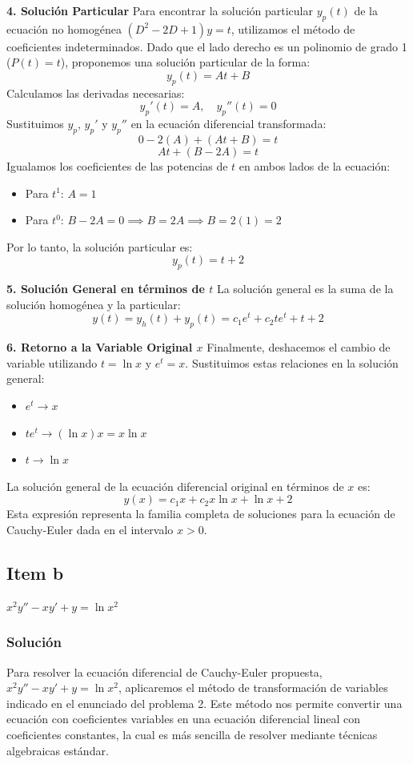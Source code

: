 \documentclass[a4paper]{article}
\begin{document}
\textbf{4. Solución Particular}
Para encontrar la solución particular $y_p(t)$ de la ecuación no homogénea $(D^2 - 2D + 1)y = t$, utilizamos el método de coeficientes indeterminados. Dado que el lado derecho es un polinomio de grado 1 ($P(t) = t$), proponemos una solución particular de la forma:
$$
y_p(t) = At + B
$$
Calculamos las derivadas necesarias:
$$
y_p'(t) = A, \quad y_p''(t) = 0
$$
Sustituimos $y_p$, $y_p'$ y $y_p''$ en la ecuación diferencial transformada:
$$
0 - 2(A) + (At + B) = t
$$
$$
At + (B - 2A) = t
$$
Igualamos los coeficientes de las potencias de $t$ en ambos lados de la ecuación:
\begin{itemize}
    \item Para $t^1$: $A = 1$
    \item Para $t^0$: $B - 2A = 0 \implies B = 2A \implies B = 2(1) = 2$
\end{itemize}
Por lo tanto, la solución particular es:
$$
y_p(t) = t + 2
$$

\textbf{5. Solución General en términos de $t$}
La solución general es la suma de la solución homogénea y la particular:
$$
y(t) = y_h(t) + y_p(t) = c_1 e^{t} + c_2 t e^{t} + t + 2
$$

\textbf{6. Retorno a la Variable Original $x$}
Finalmente, deshacemos el cambio de variable utilizando $t = \ln x$ y $e^t = x$. Sustituimos estas relaciones en la solución general:
\begin{itemize}
    \item $e^t \to x$
    \item $t e^t \to (\ln x) x = x \ln x$
    \item $t \to \ln x$
\end{itemize}
La solución general de la ecuación diferencial original en términos de $x$ es:
$$
y(x) = c_1 x + c_2 x \ln x + \ln x + 2
$$
Esta expresión representa la familia completa de soluciones para la ecuación de Cauchy-Euler dada en el intervalo $x > 0$.

\subsection{Item b}
$x^2y'' - xy' + y = \ln x^2$

\subsubsection{Solución}
Para resolver la ecuación diferencial de Cauchy-Euler propuesta, $x^2y'' - xy' + y = \ln x^2$, aplicaremos el método de transformación de variables indicado en el enunciado del problema 2. Este método nos permite convertir una ecuación con coeficientes variables en una ecuación diferencial lineal con coeficientes constantes, la cual es más sencilla de resolver mediante técnicas algebraicas estándar.
\end{document}
